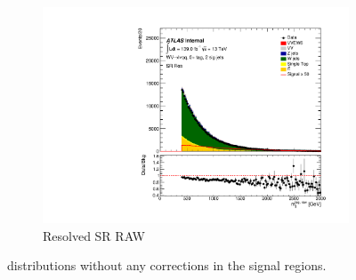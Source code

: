 \begin{figure}[ht]
\begin{subfigure}[b]{0.3\textwidth}
        \centering
        \includegraphics[width=\textwidth]{figures/mjjreweight1lep/SR_Res/stacked_plot_resolved_tagMjj_MjjWeightResolved.pdf}
        \caption{Resolved SR RAW}
        \label{fig:MC16ADE_Resolved_SR_Before}
    \end{subfigure}
    \caption{\mjjtag distributions without any corrections in the signal regions.}
    \label{fig:mjjReweight1LepMjjDistBefore}
\end{figure}

